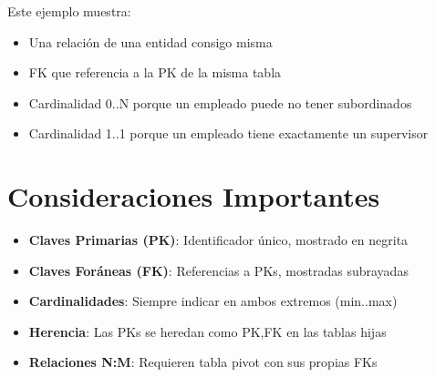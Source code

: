 \documentclass[12pt]{article}
\begin{document}
\begin{center}
\end{center}

Este ejemplo muestra:
\begin{itemize}
    \item Una relación de una entidad consigo misma
    \item FK que referencia a la PK de la misma tabla
    \item Cardinalidad 0..N porque un empleado puede no tener subordinados
    \item Cardinalidad 1..1 porque un empleado tiene exactamente un supervisor
\end{itemize}

\section{Consideraciones Importantes}
\begin{itemize}
    \item \textbf{Claves Primarias (PK)}: Identificador único, mostrado en negrita
    \item \textbf{Claves Foráneas (FK)}: Referencias a PKs, mostradas subrayadas
    \item \textbf{Cardinalidades}: Siempre indicar en ambos extremos (min..max)
    \item \textbf{Herencia}: Las PKs se heredan como PK,FK en las tablas hijas
    \item \textbf{Relaciones N:M}: Requieren tabla pivot con sus propias FKs
\end{itemize}
\end{document}
